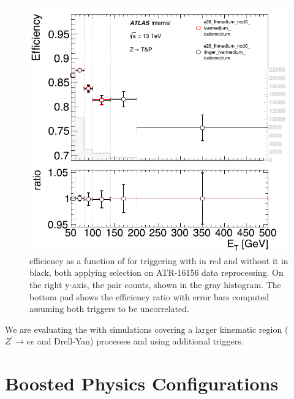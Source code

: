 \begin{figure}[htb]
  \centering
  \includegraphics[width=.5\textwidth]{sections/other_studies/figures/high_et_e28_lhmedium_nod0}
  \caption{\Zee{} \tnp{} efficiency as a function of \et{} for triggering with
  \rnn{} in red and without it in black, both applying \medium{} selection
on ATR-16156 data reprocessing. On the right y-axis, the \tnp{} pair counts,
shown in the gray histogram. The bottom pad shows the efficiency ratio with
error bars computed assuming both triggers to be
uncorrelated.\label{fig:high_et_eff}}
\end{figure}





We are evaluating the \rnn{} with simulations covering a larger kinematic region
($Z^{'}\rightarrow ee$ and Drell-Yan) processes and using additional triggers.

\section{Boosted Physics Configurations}\label{ssec:boosted_topology}



